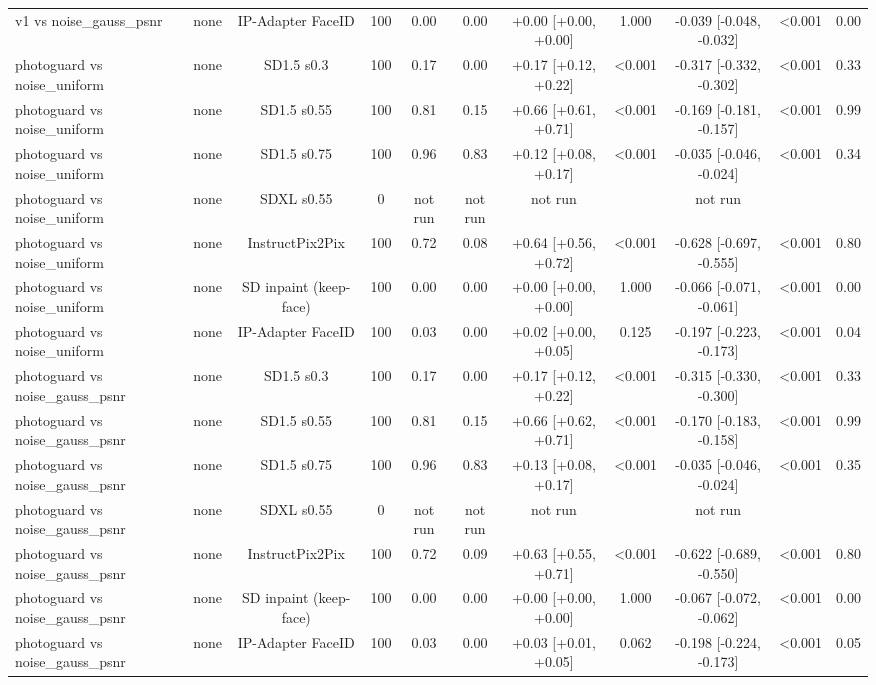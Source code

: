 \begin{table}[t]
{\begin{tabular}{lcccccccccc}
v1 vs noise\_gauss\_psnr & none & IP-Adapter FaceID & 100 & 0.00 & 0.00 & +0.00 [+0.00, +0.00] & 1.000 & -0.039 [-0.048, -0.032] & <0.001 & 0.00 \\
photoguard vs noise\_uniform & none & SD1.5 s0.3 & 100 & 0.17 & 0.00 & +0.17 [+0.12, +0.22] & <0.001 & -0.317 [-0.332, -0.302] & <0.001 & 0.33 \\
photoguard vs noise\_uniform & none & SD1.5 s0.55 & 100 & 0.81 & 0.15 & +0.66 [+0.61, +0.71] & <0.001 & -0.169 [-0.181, -0.157] & <0.001 & 0.99 \\
photoguard vs noise\_uniform & none & SD1.5 s0.75 & 100 & 0.96 & 0.83 & +0.12 [+0.08, +0.17] & <0.001 & -0.035 [-0.046, -0.024] & <0.001 & 0.34 \\
photoguard vs noise\_uniform & none & SDXL s0.55 & 0 & not run & not run & not run &  & not run &  &  \\
photoguard vs noise\_uniform & none & InstructPix2Pix & 100 & 0.72 & 0.08 & +0.64 [+0.56, +0.72] & <0.001 & -0.628 [-0.697, -0.555] & <0.001 & 0.80 \\
photoguard vs noise\_uniform & none & SD inpaint (keep-face) & 100 & 0.00 & 0.00 & +0.00 [+0.00, +0.00] & 1.000 & -0.066 [-0.071, -0.061] & <0.001 & 0.00 \\
photoguard vs noise\_uniform & none & IP-Adapter FaceID & 100 & 0.03 & 0.00 & +0.02 [+0.00, +0.05] & 0.125 & -0.197 [-0.223, -0.173] & <0.001 & 0.04 \\
photoguard vs noise\_gauss\_psnr & none & SD1.5 s0.3 & 100 & 0.17 & 0.00 & +0.17 [+0.12, +0.22] & <0.001 & -0.315 [-0.330, -0.300] & <0.001 & 0.33 \\
photoguard vs noise\_gauss\_psnr & none & SD1.5 s0.55 & 100 & 0.81 & 0.15 & +0.66 [+0.62, +0.71] & <0.001 & -0.170 [-0.183, -0.158] & <0.001 & 0.99 \\
photoguard vs noise\_gauss\_psnr & none & SD1.5 s0.75 & 100 & 0.96 & 0.83 & +0.13 [+0.08, +0.17] & <0.001 & -0.035 [-0.046, -0.024] & <0.001 & 0.35 \\
photoguard vs noise\_gauss\_psnr & none & SDXL s0.55 & 0 & not run & not run & not run &  & not run &  &  \\
photoguard vs noise\_gauss\_psnr & none & InstructPix2Pix & 100 & 0.72 & 0.09 & +0.63 [+0.55, +0.71] & <0.001 & -0.622 [-0.689, -0.550] & <0.001 & 0.80 \\
photoguard vs noise\_gauss\_psnr & none & SD inpaint (keep-face) & 100 & 0.00 & 0.00 & +0.00 [+0.00, +0.00] & 1.000 & -0.067 [-0.072, -0.062] & <0.001 & 0.00 \\
photoguard vs noise\_gauss\_psnr & none & IP-Adapter FaceID & 100 & 0.03 & 0.00 & +0.03 [+0.01, +0.05] & 0.062 & -0.198 [-0.224, -0.173] & <0.001 & 0.05 \\

\end{tabular}}
\end{table}
